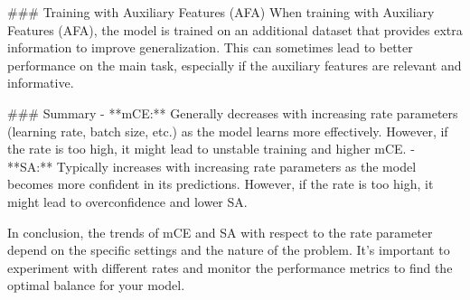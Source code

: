 ### Training with Auxiliary Features (AFA)
When training with Auxiliary Features (AFA), the model is trained on an additional dataset that provides extra information to improve generalization. This can sometimes lead to better performance on the main task, especially if the auxiliary features are relevant and informative.

### Summary
- **mCE:** Generally decreases with increasing rate parameters (learning rate, batch size, etc.) as the model learns more effectively. However, if the rate is too high, it might lead to unstable training and higher mCE.
- **SA:** Typically increases with increasing rate parameters as the model becomes more confident in its predictions. However, if the rate is too high, it might lead to overconfidence and lower SA.

In conclusion, the trends of mCE and SA with respect to the rate parameter depend on the specific settings and the nature of the problem. It's important to experiment with different rates and monitor the performance metrics to find the optimal balance for your model.